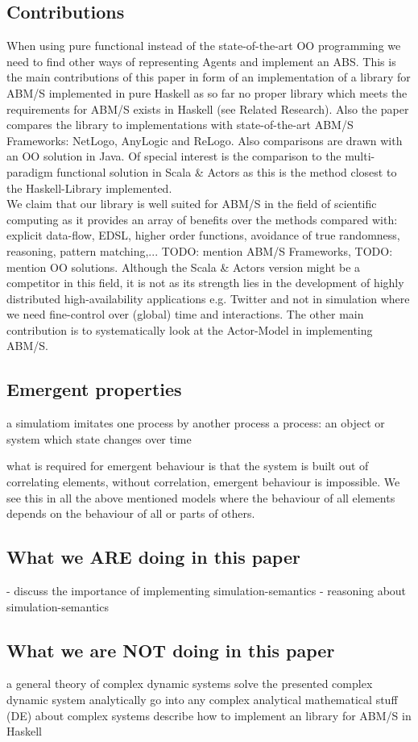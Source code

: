 \subsection{Contributions}
When using pure functional instead of the state-of-the-art OO programming we need to find other ways of representing Agents and implement an ABS. This is the main contributions of this paper in form of an implementation of a library for ABM/S implemented in pure Haskell as so far no proper library which meets the requirements for ABM/S exists in Haskell (see Related Research). Also the paper compares the library to implementations with state-of-the-art ABM/S Frameworks: NetLogo, AnyLogic and ReLogo. Also comparisons are drawn with an OO solution in Java. Of special interest is the comparison to the multi-paradigm functional solution in Scala \& Actors as this is the method closest to the Haskell-Library implemented. \\
We claim that our library is well suited for ABM/S in the field of scientific computing as it provides an array of benefits over the methods compared with: explicit data-flow, EDSL, higher order functions, avoidance of true randomness, reasoning, pattern matching,... TODO: mention ABM/S Frameworks, TODO: mention OO solutions. Although the Scala \& Actors version might be a competitor in this field, it is not as its strength lies in the development of highly distributed high-availability applications e.g. Twitter and not in simulation where we need fine-control over (global) time and interactions.
The other main contribution is to systematically look at the Actor-Model in implementing ABM/S.

\subsection{Emergent properties}
a simulatiom imitates one process by another process
a process: an object or system which state changes over time

what is required for emergent behaviour is that the system is built out of correlating elements, without correlation, emergent behaviour is impossible. We see this in all the above mentioned models where the behaviour of all elements depends on the behaviour of all or parts of others. 


\subsection{What we ARE doing in this paper}
- discuss the importance of implementing simulation-semantics
- reasoning about simulation-semantics

\subsection{What we are NOT doing in this paper}
a general theory of complex dynamic systems
solve the presented complex dynamic system analytically
go into any complex analytical mathematical stuff (DE) about complex systems
describe how to implement an library for ABM/S in Haskell

